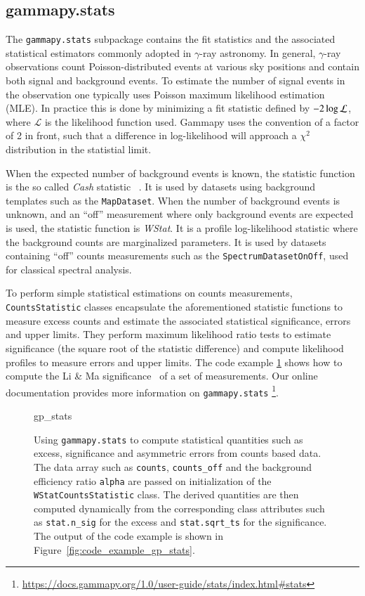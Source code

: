 \documentclass[longauth]{aa}
\newcommand{\code}[1]{\texttt{#1}}
\newcommand{\gammapy}{Gammapy\xspace}
\newcommand{\gammaray}{$\gamma$-ray\xspace}
\begin{document}
\subsection{gammapy.stats}
\label{ssec:gammapy-stats}
The \code{gammapy.stats} subpackage contains the fit statistics and the associated
statistical estimators commonly adopted in \gammaray astronomy. In
general, \gammaray observations count Poisson-distributed events at various sky
positions and contain both signal and background events.
To estimate the number of signal events in the observation one typically uses
Poisson maximum likelihood estimation (MLE). In practice this is done
by minimizing a fit statistic defined by $-2 \time\cdot \log{\mathcal{L}}$,
where $\mathcal{L}$ is the likelihood function used. \gammapy uses the convention
of a factor of 2 in front, such that a difference in log-likelihood will
approach a $\chi^2$ distribution in the statistial limit.

When the expected number of background events is known, the statistic function 
is the so called \emph{Cash} statistic ~\citep{Cash}. It is used by datasets using background
templates such as the
\code{MapDataset}. When the number of background events is unknown, and an \enquote{off}
measurement where only background events are expected is used, the statistic
function is \emph{WStat}. It is a profile log-likelihood statistic where the background
counts are marginalized parameters. It is used by datasets containing \enquote{off}
counts measurements such as the \code{SpectrumDatasetOnOff}, used for classical
spectral analysis.

To perform simple statistical estimations on counts measurements,
\code{CountsStatistic} classes encapsulate the aforementioned statistic functions to
measure excess counts and estimate the associated statistical significance,
errors and upper limits. They perform maximum likelihood ratio tests to
estimate significance (the square root of the statistic difference) and compute
likelihood profiles to measure errors and upper limits. The code example
\ref{fig*:minted:gp_stats} shows how to compute the Li \& Ma
significance~\citep{LiMa} of a set of measurements.
Our online documentation provides more information on \code{gammapy.stats}
\footnote{\url{https://docs.gammapy.org/1.0/user-guide/stats/index.html\#stats}}. 

\begin{figure}
        \small
        {gp_stats}
        \caption{
        Using \code{gammapy.stats} to compute statistical quantities
        such as excess, significance and asymmetric errors
        from counts based data. The data array such as \code{counts}, \code{counts\_off}
                and the background efficiency ratio \code{alpha} are passed on initialization
        of the \code{WStatCountsStatistic} class. The derived quantities
        are then computed dynamically from the corresponding class
        attributes such as \code{stat.n\_sig} for the excess
                and \code{stat.sqrt\_ts} for the significance.
                The output of the code example is shown in Figure~\ref{fig:code_example_gp_stats}.
    }
        \label{fig*:minted:gp_stats}
\end{figure}
\end{document}
